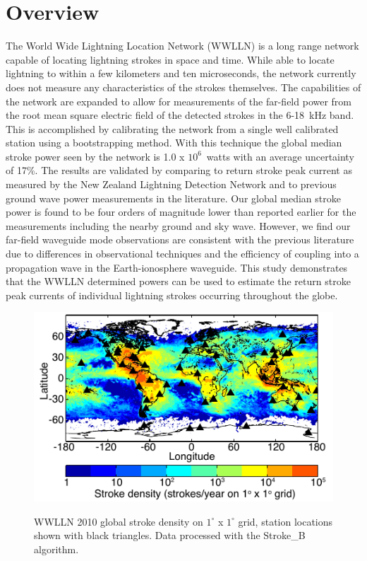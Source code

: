 
\section{Overview}

The World Wide Lightning Location Network (WWLLN) is a long range network capable of locating lightning strokes in space and time.
While able to locate lightning to within a few kilometers and ten microseconds, the network currently does not measure any characteristics of the strokes themselves.
The capabilities of the network are expanded to allow for measurements of the far-field power from the root mean square electric field of the detected strokes in the 6-18~kHz band.
This is accomplished by calibrating the network from a single well calibrated station using a bootstrapping method.
With this technique the global median stroke power seen by the network is 1.0 x $10^6$~watts with an average uncertainty of 17\%.
The results are validated by comparing to return stroke peak current as measured by the New Zealand Lightning Detection Network and to previous ground wave power measurements in the literature.
Our global median stroke power is found to be four orders of magnitude lower than reported earlier for the measurements including the nearby ground and sky wave.
However, we find our far-field waveguide mode observations are consistent with the previous literature due to differences in observational techniques and the efficiency of coupling into a propagation wave in the Earth-ionosphere waveguide.
This study demonstrates that the WWLLN determined powers can be used to estimate the return stroke peak currents of individual lightning strokes occurring throughout the globe.


\begin{figure}[ht!]
\centering
\includegraphics[scale=2]{energy/Figures/PPS_WWLLN_2010.pdf}\\
\caption{WWLLN 2010 global stroke density on $1^\circ$ x $1^\circ$ grid, station locations shown with black triangles. Data processed with the Stroke\_B algorithm.}
\label{energy:fig:wwlln_dist}
\end{figure}

